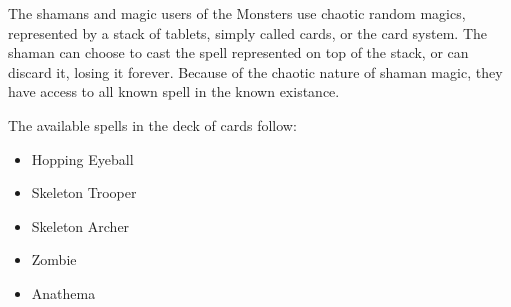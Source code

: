 \documentclass[a4paper,twocolumn]{article}
\begin{document}
The shamans and magic users of the Monsters use chaotic random magics, represented by a stack of tablets, simply called cards, or the card system. The shaman can choose to cast the spell represented on top of the stack, or can discard it, losing it forever. Because of the chaotic nature of shaman magic, they have access to all known spell in the known existance.

The available spells in the deck of cards follow:

\begin{itemize}
\item Hopping Eyeball
\item Skeleton Trooper
\item Skeleton Archer
\item Zombie
\item Anathema
\end{itemize}
\end{document}
